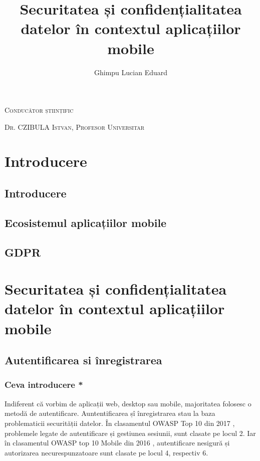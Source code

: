 \documentclass[12pt]{article}
\begin{document}
\title{Securitatea și confidențialitatea datelor în contextul aplicațiilor mobile}

\author{Ghimpu Lucian Eduard}
\maketitle

\textsc{Conducător științific}

\textsc{Dr. CZIBULA Istvan, Profesor Universitar}

\newpage

\tableofcontents


\section{Introducere}
\subsection{Introducere}
\subsection{Ecosistemul aplicațiilor mobile}
\subsection{GDPR}

\section{Securitatea și confidențialitatea datelor în contextul aplicațiilor mobile}


\subsection{Autentificarea si înregistrarea}
\newpage
\subsubsection{Ceva introducere *}

Indiferent că vorbim de aplicații web, desktop sau mobile, majoritatea folosesc 
o metodă de autentificare. Auntentificarea șî înregistrarea stau la baza
problematicii securității datelor. În clasamentul OWASP Top 10 din 2017 \cite{owasp-top10-2017}, 
problemele legate de autentificare și gestiunea sesiunii, sunt clasate pe locul 2. Iar în
clasamentul OWASP top 10 Mobile din 2016 \cite{owasp-top10-mobile}, autentificare nesigură
și autorizarea necurespunzatoare sunt clasate pe locul 4, respectiv 6.
\end{document}
